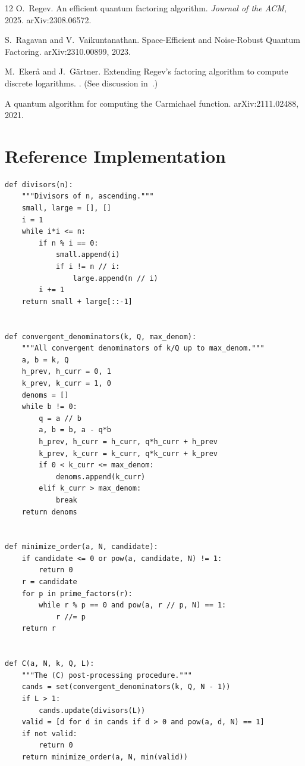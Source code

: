 \documentclass[11pt]{article}
\begin{document}
\begin{thebibliography}{12}
O.~Regev.
\newblock An efficient quantum factoring algorithm.
\newblock \emph{Journal of the ACM}, 2025.
\newblock arXiv:2308.06572.

S.~Ragavan and V.~Vaikuntanathan.
\newblock Space-Efficient and Noise-Robust Quantum Factoring.
\newblock arXiv:2310.00899, 2023.

M.~Ekerå and J.~Gärtner.
\newblock Extending Regev's factoring algorithm to compute discrete logarithms.
. (See discussion in~\cite{ragavan2023}.)

A quantum algorithm for computing the {C}armichael function.
\newblock arXiv:2111.02488, 2021.

\end{thebibliography}

\appendix

\section{Reference Implementation}
\label{app:impl}

\begin{lstlisting}[style=pythonstyle]
def divisors(n):
    """Divisors of n, ascending."""
    small, large = [], []
    i = 1
    while i*i <= n:
        if n % i == 0:
            small.append(i)
            if i != n // i:
                large.append(n // i)
        i += 1
    return small + large[::-1]


def convergent_denominators(k, Q, max_denom):
    """All convergent denominators of k/Q up to max_denom."""
    a, b = k, Q
    h_prev, h_curr = 0, 1
    k_prev, k_curr = 1, 0
    denoms = []
    while b != 0:
        q = a // b
        a, b = b, a - q*b
        h_prev, h_curr = h_curr, q*h_curr + h_prev
        k_prev, k_curr = k_curr, q*k_curr + k_prev
        if 0 < k_curr <= max_denom:
            denoms.append(k_curr)
        elif k_curr > max_denom:
            break
    return denoms


def minimize_order(a, N, candidate):
    if candidate <= 0 or pow(a, candidate, N) != 1:
        return 0
    r = candidate
    for p in prime_factors(r):
        while r % p == 0 and pow(a, r // p, N) == 1:
            r //= p
    return r


def C(a, N, k, Q, L):
    """The (C) post-processing procedure."""
    cands = set(convergent_denominators(k, Q, N - 1))
    if L > 1:
        cands.update(divisors(L))
    valid = [d for d in cands if d > 0 and pow(a, d, N) == 1]
    if not valid:
        return 0
    return minimize_order(a, N, min(valid))
\end{lstlisting}
\end{document}
